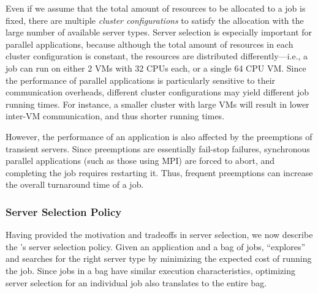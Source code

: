 


Even if we assume that the total amount of resources to be allocated to a job is fixed, there are multiple \emph{cluster configurations} to satisfy the allocation with the large number of available server types. 
Server selection is especially important for parallel applications, because although the total amount of resources in each cluster configuration is constant, the resources are distributed differently---i.e., a job can run on either 2 VMs with 32 CPUs each, or a single 64 CPU VM.  
Since the performance of parallel applications is particularly sensitive to their communication overheads, different cluster configurations may yield different job running times.
For instance, a smaller cluster with large VMs will result in lower inter-VM communication, and thus shorter running times. 

However, the performance of an application is also affected by the preemptions of transient servers.
Since preemptions are essentially fail-stop failures, synchronous parallel applications (such as those using MPI) are forced to  abort, and completing the job requires restarting it. 
Thus, frequent preemptions can increase the overall turnaround time of a job. 

\vspace*{\subsecspace}
\subsubsection{Server Selection Policy}

Having provided the motivation and tradeoffs in server selection, we now describe the \sysname's server selection policy. 
Given an application and a bag of jobs, \sysname ``explores'' and searches for the right server type by minimizing the expected cost of running the job.
Since jobs in a bag have similar execution characteristics, optimizing server selection for an individual job also translates to the entire bag. 


